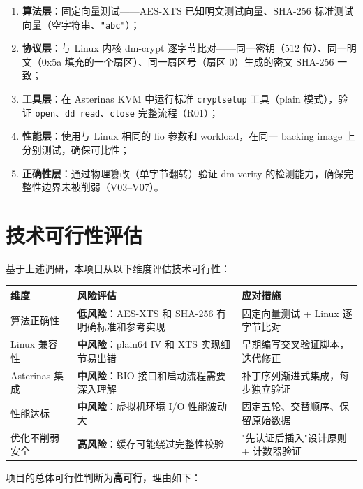 \begin{enumerate}
    \item \textbf{算法层}：固定向量测试——AES-XTS 已知明文测试向量、SHA-256 标准测试向量（空字符串、\texttt{"abc"}）；
    \item \textbf{协议层}：与 Linux 内核 dm-crypt 逐字节比对——同一密钥（512 位）、同一明文（0x5a 填充的一个扇区）、同一扇区号（扇区 0）生成的密文 SHA-256 一致；
    \item \textbf{工具层}：在 Asterinas KVM 中运行标准 \texttt{cryptsetup} 工具（plain 模式），验证 \texttt{open}、\texttt{dd read}、\texttt{close} 完整流程（R01）；
    \item \textbf{性能层}：使用与 Linux 相同的 fio 参数和 workload，在同一 backing image 上分别测试，确保可比性；
    \item \textbf{正确性层}：通过物理篡改（单字节翻转）验证 dm-verity 的检测能力，确保完整性边界未被削弱（V03--V07）。
\end{enumerate}

\section{技术可行性评估}

基于上述调研，本项目从以下维度评估技术可行性：

\begin{table}[H]
    \centering
    \begin{tabular}{p{}p{}p{}}
        \toprule
        \textbf{维度} & \textbf{风险评估} & \textbf{应对措施} \\
        \midrule
        算法正确性 & \textbf{低风险}：AES-XTS 和 SHA-256 有明确标准和参考实现 & 固定向量测试 + Linux 逐字节比对 \\
        Linux 兼容性 & \textbf{中风险}：plain64 IV 和 XTS 实现细节易出错 & 早期编写交叉验证脚本，迭代修正 \\
        Asterinas 集成 & \textbf{中风险}：BIO 接口和启动流程需要深入理解 & 补丁序列渐进式集成，每步独立验证 \\
        性能达标 & \textbf{中风险}：虚拟机环境 I/O 性能波动大 & 固定五轮、交替顺序、保留原始数据 \\
        优化不削弱安全 & \textbf{高风险}：缓存可能绕过完整性校验 & "先认证后插入"设计原则 + 计数器验证 \\
        \bottomrule
    \end{tabular}
\end{table}

项目的总体可行性判断为\textbf{高可行}，理由如下：

